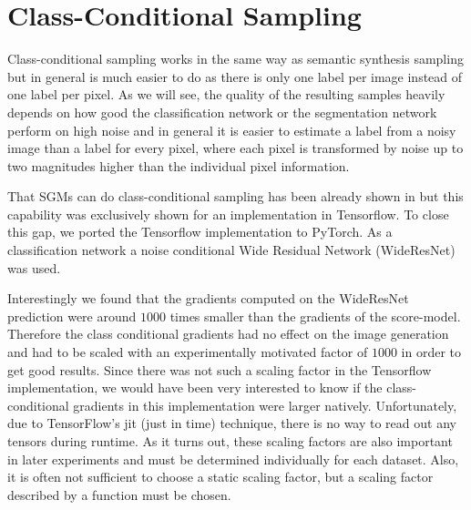 

\section{Class-Conditional Sampling} \label{sec:5.1}
Class-conditional sampling works in the same way as semantic synthesis sampling but in general is much easier to do as there is only one label per image instead of one label per pixel. As we will see, the quality of the resulting samples heavily depends on how good the classification network or the segmentation network perform on high noise and in general it is easier to estimate a label from a noisy image than a label for every pixel, where each pixel is transformed by noise up to two magnitudes higher than the individual pixel information.

That SGMs can do class-conditional sampling has been already shown in \cite{score_3} but this capability was exclusively shown for an implementation in Tensorflow. To close this gap, we ported the Tensorflow implementation to PyTorch. As a classification network a noise conditional Wide Residual Network (WideResNet) \cite{wrn} was used. 

Interestingly we found that the gradients computed on the WideResNet prediction were around $1000$ times smaller than the gradients of the score-model. Therefore the class conditional gradients had no effect on the image generation and had to be scaled with an experimentally motivated factor of $1000$ in order to get good results. Since there was not such a scaling factor in the Tensorflow implementation, we would have been very interested to know if the class-conditional gradients in this implementation were larger natively. Unfortunately, due to TensorFlow's jit (just in time) technique, there is no way to read out any tensors during runtime. As it turns out, these scaling factors are also important in later experiments and must be determined individually for each dataset. Also, it is often not sufficient to choose a static scaling factor, but a scaling factor described by a function must be chosen.

